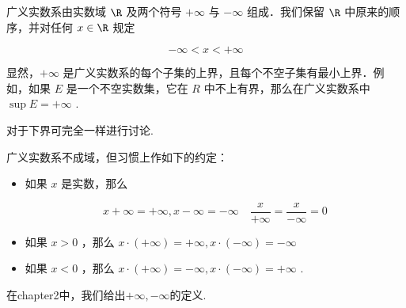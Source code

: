 \begin{definition}广义实数系由实数域 $\R$ 及两个符号 $+\infty$ 与 $-\infty$ 组成．我们保留 $\R$ 中原来的顺序，并对任何 $x \in \R$ 规定
	
	$$
	-\infty<x<+\infty
	$$
	
\end{definition}
显然，$+\infty$ 是广义实数系的每个子集的上界，且每个不空子集有最小上界．例如，如果 $E$ 是一个不空实数集，它在 $R$ 中不上有界，那么在广义实数系中 $\sup E=+\infty$ .

对于下界可完全一样进行讨论.

广义实数系不成域，但习惯上作如下的约定：
\begin{itemize}
	\item 如果 $x$ 是实数，那么
	
	$$
	x+\infty=+\infty, x-\infty=-\infty \quad \dfrac{x}{+\infty}=\dfrac{x}{-\infty}=0
	$$
	\item 如果 $x>0$ ，那么 $x \cdot(+\infty)=+\infty, x \cdot(-\infty)=-\infty$ 
	\item 如果 $x<0$ ，那么 $x \cdot(+\infty)=-\infty, x \cdot(-\infty)=+\infty$ .
\end{itemize}
在chapter2中，我们给出$+\infty,-\infty$的定义.

